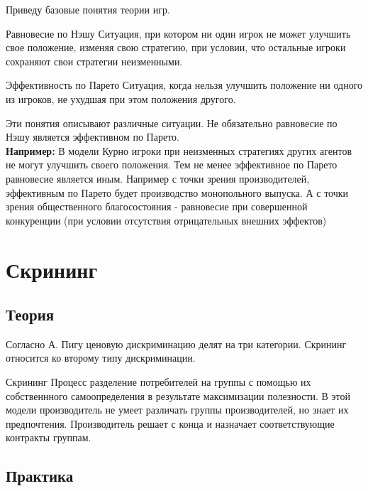 \indent\setlength{\parindent}{1em}Приведу базовые понятия теории игр.\smallskip

\begin{mybox}{Равновесие по Нэшу}
    Ситуация, при котором ни один игрок не может улучшить свое положение, изменяя свою стратегию, при условии, что
    остальные игроки сохраняют свои стратегии неизменными.
\end{mybox}

\begin{mybox}{Эффективность по Парето}
    Ситуация, когда нельзя улучшить положение ни одного из игроков, не ухудшая при этом положения другого.
\end{mybox}

Эти понятия описывают различные ситуации. Не обязательно равновесие по Нэшу является эффективном по Парето.
\smallskip\\\indent\setlength{\parindent}{1em} \textbf{Например:} В модели Курно игроки при неизменных стратегиях
других агентов не могут улучшить своего положения. Тем не менее эффективное по Парето равновесие является иным. Например
с точки зрения производителей, эффективным по Парето будет производство монопольного выпуска. А с точки зрения
общественного благосостояния - равновесие при совершенной конкуренции (при условии отсутствия отрицательных внешних
эффектов)

\newpage


\section{Скрининг}

\subsection{Теория}

\indent\setlength{\parindent}{1em} Согласно А. Пигу ценовую дискриминацию делят на три категории. Скрининг относится
ко второму типу дискриминации.\smallskip

\begin{mybox}{Скрининг}
    Процесс разделение потребителей на группы с помощью их собственнного самоопределения в результате максимизации
    полезности. В этой модели производитель не умеет различать группы производителей, но знает их предпочтения.
    Производитель решает с конца и назначает соответствующие контракты группам.
\end{mybox}


\subsection{Практика}

